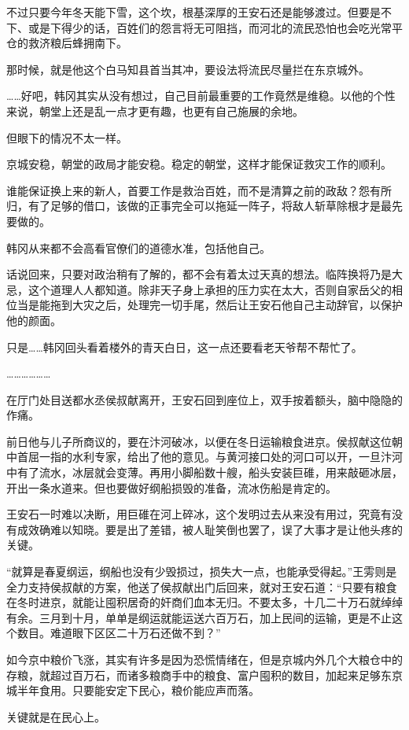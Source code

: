 不过只要今年冬天能下雪，这个坎，根基深厚的王安石还是能够渡过。但要是不下、或是下得少的话，百姓们的怨言将无可阻挡，而河北的流民恐怕也会吃光常平仓的救济粮后蜂拥南下。

那时候，就是他这个白马知县首当其冲，要设法将流民尽量拦在东京城外。

……好吧，韩冈其实从没有想过，自己目前最重要的工作竟然是维稳。以他的个性来说，朝堂上还是乱一点才更有趣，也更有自己施展的余地。

但眼下的情况不太一样。

京城安稳，朝堂的政局才能安稳。稳定的朝堂，这样才能保证救灾工作的顺利。

谁能保证换上来的新人，首要工作是救治百姓，而不是清算之前的政敌？怨有所归，有了足够的借口，该做的正事完全可以拖延一阵子，将敌人斩草除根才是最先要做的。

韩冈从来都不会高看官僚们的道德水准，包括他自己。

话说回来，只要对政治稍有了解的，都不会有着太过天真的想法。临阵换将乃是大忌，这个道理人人都知道。除非天子身上承担的压力实在太大，否则自家岳父的相位当是能拖到大灾之后，处理完一切手尾，然后让王安石他自己主动辞官，以保护他的颜面。

只是……韩冈回头看着楼外的青天白日，这一点还要看老天爷帮不帮忙了。

………………

在厅门处目送都水丞侯叔献离开，王安石回到座位上，双手按着额头，脑中隐隐的作痛。

前日他与儿子所商议的，要在汴河破冰，以便在冬日运输粮食进京。侯叔献这位朝中首屈一指的水利专家，给出了他的意见。与黄河接口处的河口可以开，一旦汴河中有了流水，冰层就会变薄。再用小脚船数十艘，船头安装巨碓，用来敲砸冰层，开出一条水道来。但也要做好纲船损毁的准备，流冰伤船是肯定的。

王安石一时难以决断，用巨碓在河上碎冰，这个发明过去从来没有用过，究竟有没有成效确难以知晓。要是出了差错，被人耻笑倒也罢了，误了大事才是让他头疼的关键。

“就算是春夏纲运，纲船也没有少毁损过，损失大一点，也能承受得起。”王雱则是全力支持侯叔献的方案，他送了侯叔献出门后回来，就对王安石道：“只要有粮食在冬时进京，就能让囤积居奇的奸商们血本无归。不要太多，十几二十万石就绰绰有余。三月到十月，单单是纲运就能运送六百万石，加上民间的运输，更是不止这个数目。难道眼下区区二十万石还做不到？”

如今京中粮价飞涨，其实有许多是因为恐慌情绪在，但是京城内外几个大粮仓中的存粮，就超过百万石，而诸多粮商手中的粮食、富户囤积的数目，加起来足够东京城半年食用。只要能安定下民心，粮价能应声而落。

关键就是在民心上。

